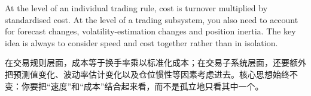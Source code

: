 \begin{englishblock} At the level of an individual trading rule, cost is turnover multiplied by standardised cost. At the level of a trading subsystem, you also need to account for forecast changes, volatility-estimation changes and position inertia. The key idea is always to consider speed and cost together rather than in isolation. \end{englishblock}

\begin{chineseblock}在交易规则层面，成本等于换手率乘以标准化成本；在交易子系统层面，还要额外把预测值变化、波动率估计变化以及仓位惯性等因素考虑进去。核心思想始终不变：你要把“速度”和“成本”结合起来看，而不是孤立地只看其中一个。\end{chineseblock}


